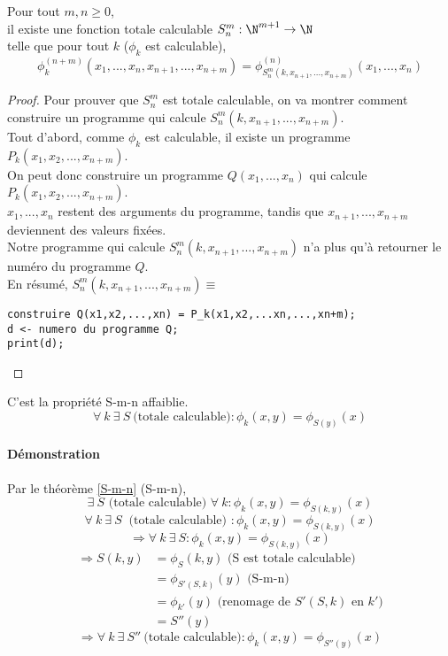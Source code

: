 \begin{mytheo}[S-m-n]
	\label{S-m-n}Pour tout $m,n \geq 0$, \\
	il existe une fonction totale calculable $S^m_n : \N^{m+1} \rightarrow
	\N$ \\
	telle que pour tout $k$ ($\phi_k$ est calculable),
	$$ \phi^{(n+m)}_k(x_1,...,x_n,x_{n+1},...,x_{n+m}) =
	\phi^{(n)}_{S^m_n(k,x_{n+1}, ...,x_{n+m})} (x_1,...,x_n)$$
\end{mytheo}

\begin{proof}
	Pour prouver que $S^m_n$ est totale calculable, on va montrer comment construire un programme qui
	calcule  $S^m_n(k,x_{n+1}, ...,x_{n+m})$.\\
	Tout d'abord, comme $\phi_k$ est calculable, il existe un programme
	$P_k(x_1,x_2,...,x_{n+m})$.\\
	On peut donc construire un programme $Q(x_1,...,x_n)$ qui calcule
	$P_k(x_1,x_2,...,x_{n+m})$.\\
	$x_1,...,x_n$ restent des arguments du programme,
	tandis que $x_{n+1},...,x_{n+m}$ deviennent des valeurs fixées.\\
	Notre programme qui calcule $S^m_n(k,x_{n+1}, ...,x_{n+m})$ n'a plus
	qu'à retourner le numéro du programme $Q$.\\
       	En résumé, $S^m_n(k,x_{n+1},
	...,x_{n+m}) \equiv$
	\begin{lstlisting}
construire Q(x1,x2,...,xn) = P_k(x1,x2,...xn,...,xn+m);
d <- numero du programme Q;
print(d);
	\end{lstlisting}
\end{proof}

\begin{mytheo}[S]
	C'est la propriété S-m-n affaiblie.
	\[ \forall \ k \ \exists \ S \ \text{(totale calculable)} : \phi_k(x,y)=\phi_{S(y)}(x)\]
\end{mytheo}

\paragraph{Démonstration}
	Par le théorème \ref{S-m-n} (S-m-n),
	\[ \exists \ S \text{ (totale calculable) } \forall \ k : \phi_k(x,y)=\phi_{S(k,y)}(x)\]
	\[ \forall \ k \ \exists \ S \ \text{ (totale calculable) } : \phi_k(x,y)=\phi_{S(k,y)}(x)\]
	\[ \Rightarrow \forall \ k \ \exists \ S : \phi_k(x,y) =\phi_{S(k,y)}(x) \]
	\begin{align}
		\Rightarrow S(k,y) &= \phi_{S}(k,y) \text{ (S est totale calculable)}\\
		&= \phi_{S'(S,k)}(y) \text{ (S-m-n)}\\
		&= \phi_{k'}(y) \text{ (renomage de } S'(S,k) \text{ en } k' \text{)}\\
		&= S''(y)
	\end{align}
	\[ \Rightarrow \forall \ k \ \exists \ S'' \ \text{(totale calculable)} :
       	\phi_k(x,y)=\phi_{S''(y)}(x)\]

